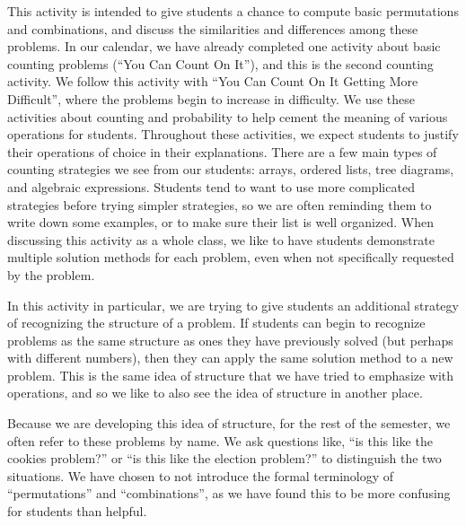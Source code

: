\documentclass[nooutcomes]{ximera}
\begin{document}
\newpage
\begin{instructorNotes}
This activity is intended to give students a chance to compute basic permutations and combinations, and discuss the similarities and differences among these problems.  In our calendar, we have already completed one activity about basic counting problems (``You Can Count On It''), and this is the second counting activity.  We follow this activity with ``You Can Count On It Getting More Difficult'', where the problems begin to increase in difficulty.  We use these activities about counting and probability to help cement the meaning of various operations for students.  Throughout these activities, we expect students to justify their operations of choice in their explanations.  There are a few main types of counting strategies we see from our students: arrays, ordered lists, tree diagrams, and algebraic expressions.  Students tend to want to use more complicated strategies before trying simpler strategies, so we are often reminding them to write down some examples, or to make sure their list is well organized. When discussing this activity as a whole class, we like to have students demonstrate multiple solution methods for each problem, even when not specifically requested by the problem.  

In this activity in particular, we are trying to give students an additional strategy of recognizing the structure of a problem.  If students can begin to recognize problems as the same structure as ones they have previously solved (but perhaps with different numbers), then they can apply the same solution method to a new problem.  This is the same idea of structure that we have tried to emphasize with operations, and so we like to also see the idea of structure in another place.

Because we are developing this idea of structure, for the rest of the semester, we often refer to these problems by name.  We ask questions like, ``is this like the cookies problem?'' or ``is this like the election problem?'' to distinguish the two situations.  We have chosen to not  introduce the formal terminology of ``permutations'' and ``combinations'', as we have found this to be more confusing for students than helpful.  

\end{instructorNotes}
\end{document}
